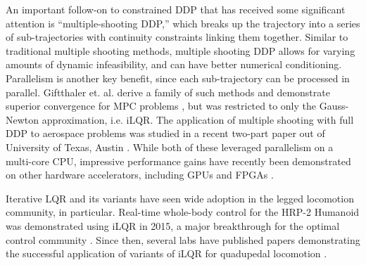 \documentclass[../root.tex]{subfiles}
\begin{document}
An important follow-on to constrained DDP that has received some significant
attention is ``multiple-shooting DDP,'' which breaks up the trajectory into a
series of sub-trajectories with continuity constraints linking them together.
Similar to traditional multiple shooting methods, multiple shooting DDP
allows for varying amounts of dynamic infeasibility, and can have better
numerical conditioning. Parallelism is another key benefit, since each
sub-trajectory can be processed in parallel. Giftthaler et. al. derive a
family of such methods and demonstrate superior convergence for MPC problems
\cite{giftthaler_Family_2017}, but was restricted to only the Gauss-Newton
approximation, i.e. iLQR. The application of multiple shooting with full DDP
to aerospace problems was studied in a recent two-part paper out of
University of Texas, Austin
\cite{pellegrini_multipleshooting_2020,pellegrini_multipleshooting_2020a}.
While both of these leveraged parallelism on a multi-core CPU, impressive
performance gains have recently been demonstrated on other hardware
accelerators, including GPUs and FPGAs \cite{plancher_Performance_2020}.

Iterative LQR and its variants have seen wide adoption in the legged
locomotion community, in particular. Real-time whole-body control for the
HRP-2 Humanoid was demonstrated using iLQR in 2015, a major breakthrough for
the optimal control community \cite{koenemann_Wholebody_2015}. Since then,
several labs have published papers demonstrating the successful application
of variants of iLQR for quadupedal locomotion
\cite{farshidian_efficient_2017,mastalli_Crocoddyl_2019,neunert_WholeBody_2018}.
\end{document}

